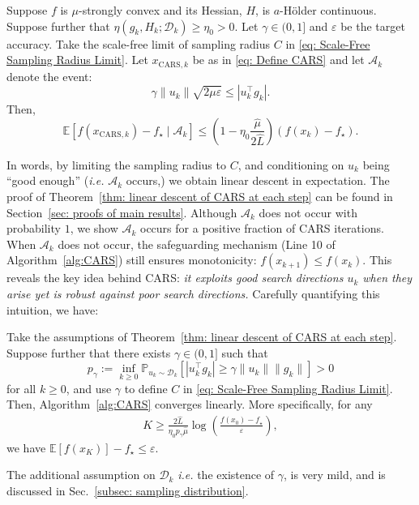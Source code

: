 \begin{theorem}
    \label{thm: linear descent of CARS at each step}
    Suppose $f$ is $\mu$-strongly convex and its Hessian, $H$, is $a$-H\"{o}lder continuous. Suppose further that $\eta(g_k, H_k; \mathcal{D}_k) \geq \eta_{0} > 0$. Let $\gamma \in (0,1]$ and $\varepsilon$ be the target accuracy. Take the scale-free limit of sampling radius $C$ in  \eqref{eq: Scale-Free Sampling Radius Limit}. Let $x_{\mathrm{CARS}, k}$ be as in \eqref{eq: Define CARS} and let $\mathcal{A}_k$ denote the event:
    \begin{equation} \label{eq: condition on u}
        \gamma \|u_k\| \sqrt{2\mu\varepsilon} \leq |{u}_k^{\top}g_k|.
    \end{equation}
    Then,
    \begin{equation}
        \mathbb{E}\left[f(x_{\mathrm{CARS}, k}) - f_\star \mid \mathcal{A}_k \right] \leq \left(1 - \eta_{0}\frac{\hat{\mu}}{2\hat{L}}\right)(f(x_k) - f_\star).
        \label{eq: CARS Descent}
    \end{equation}
\end{theorem}
In words, by limiting the sampling radius to $C$, and conditioning on $u_k$ being ``good enough'' (\emph{i.e.} $\mathcal{A}_k$ occurs,) we obtain linear descent in  expectation. The proof of Theorem~\ref{thm: linear descent of CARS at each step} can be found in Section~\ref{sec: proofs of main results}. Although $\mathcal{A}_k$ does not occur with probability $1$, we show $\mathcal{A}_k$ occurs for a positive fraction of CARS iterations. When $\mathcal{A}_k$ does not occur, the safeguarding mechanism (Line 10 of Algorithm~\ref{alg:CARS}) still ensures monotonicity: $f(x_{k+1}) \leq f(x_k)$. This reveals the key idea behind CARS: {\em it exploits good search directions $u_k$ when they arise yet is robust against poor search directions.} Carefully quantifying this intuition, we have:


\begin{corollary}\label{thm:convergence of cars; strongly cvx}
    Take the assumptions of Theorem~\ref{thm: linear descent of CARS at each step}. Suppose further that there exists $\gamma \in (0,1]$ such that
    \begin{equation}\label{eq: p_gamma defining inequality}
        p_{\gamma} := \inf_{k\geq 0} \mathbb{P}_{u_k\sim\mathcal{D}_k} \left[ |u_k^{\top}g_k| \geq \gamma\|u_k\|\|g_k\|\right] >0
    \end{equation}
    for all $k\geq 0$, and use $\gamma$ to define $C$ in \eqref{eq: Scale-Free Sampling Radius Limit}.
    Then, Algorithm~\ref{alg:CARS} converges linearly. More specifically,
    for any
    \begin{align*}
        K \geq \frac{2\hat{L}}{\eta_0 p_{\gamma}\hat{\mu}} \log\left(\frac{f(x_0) - f_\star}{\varepsilon} \right),
    \end{align*}
    we have $\mathbb{E}[f(x_K)] - f_\star \leq \varepsilon$.
\end{corollary}
\noindent The additional assumption on $\mathcal{D}_k$ {\em i.e.} the existence of $\gamma$, is very mild, and is discussed in Sec.~\ref{subsec: sampling distribution}.

